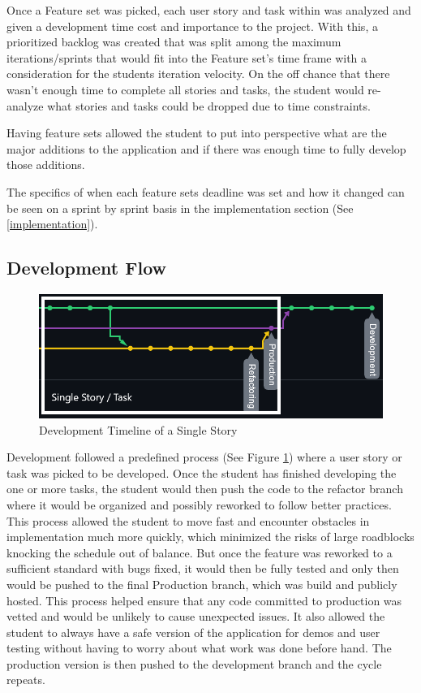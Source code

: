 Once a Feature set was picked, each user story and task within was analyzed and given a development time cost and importance to the project. With this, a prioritized backlog was created that was split among the maximum iterations/sprints that would fit into the Feature set's time frame with a consideration for the students iteration velocity. On the off chance that there wasn't enough time to complete all stories and tasks, the student would re-analyze what stories and tasks could be dropped due to time constraints.

Having feature sets allowed the student to put into perspective what are the major additions to the application and if there was enough time to fully develop those additions.

The specifics of when each feature sets deadline was set and how it changed can be seen on a sprint by sprint basis in the implementation section (See \ref{implementation}).

\subsection{Development Flow} \label{devflow}
\begin{figure}
    \centering
    \includegraphics[width=1\columnwidth]{author-files/figures/SingleStoryPath2.png}
    \caption{Development Timeline of a Single Story}
    \label{fig:singlestory}
\end{figure}

Development followed a predefined process (See Figure \ref{fig:singlestory}) where a user story or task was picked to be developed. Once the student has finished developing the one or more tasks, the student would then push the code to the refactor branch where it would be organized and possibly reworked to follow better practices. This process allowed the student to move fast and encounter obstacles in implementation much more quickly, which minimized the risks of large roadblocks knocking the schedule out of balance. But once the feature was reworked to a sufficient standard with bugs fixed, it would then be fully tested and only then would be pushed to the final Production branch, which was build and publicly hosted.
This process helped ensure that any code committed to production was vetted and would be unlikely to cause unexpected issues. It also allowed the student to always have a safe version of the application for demos and user testing without having to worry about what work was done before hand.
The production version is then pushed to the development branch and the cycle repeats.


